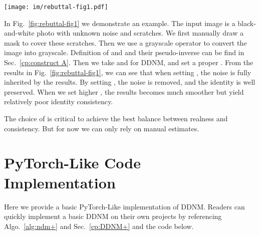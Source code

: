 \documentclass{article} \usepackage{iclr2023_conference,times}
\begin{document}
\begin{figure*}[ht]
  \centering
  \texttt{[image: im/rebuttal-fig1.pdf]}
  \vspace{-0.5cm}
  \caption{Old photo restoration. Zoom in for the best view. By setting , the noise is removed, and the identity is well preserved. When we set higher , the results becomes much smoother but yield relatively poor identity consistency.}
\label{fig:rebuttal-fig1} 
\end{figure*}

In Fig.~\ref{fig:rebuttal-fig1} we demonstrate an example. The input image  is a black-and-white photo with unknown noise and scratches. We first manually draw a mask  to cover these scratches. Then we use a grayscale operator  to convert the image into grayscale. Definition of  and  and their pseudo-inverse can be find in Sec.~\ref{cp:construct A}. Then we take  and  for DDNM, and set a proper . From the results in Fig.~\ref{fig:rebuttal-fig1}, we can see that when setting , the noise is fully inherited by the results. By setting , the noise is removed, and the identity is well preserved. When we set higher , the results becomes much smoother but yield relatively poor identity consistency. 

The choice of  is critical to achieve the best balance between realness and consistency. But for now we can only rely on manual estimates.


\newpage




\section{PyTorch-Like Code Implementation}
\label{pseudo code}

Here we provide a basic PyTorch-Like implementation of DDNM. Readers can quickly implement a basic DDNM on their own projects by referencing Algo.~\ref{alg:ndm+} and Sec.~\ref{cp:DDNM+} and the code below.
\end{document}
